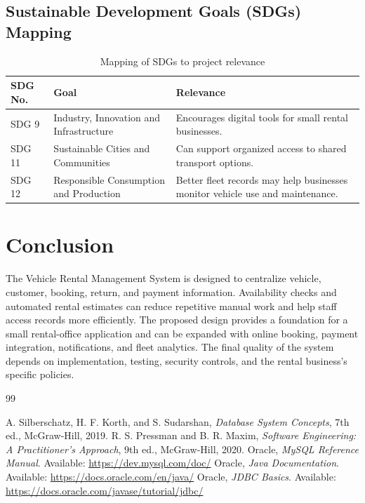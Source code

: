 \documentclass[11pt,a4paper]{report}
\begin{document}
\subsection{Sustainable Development Goals (SDGs) Mapping}
\begin{longtable}{|p{2cm}|p{5cm}|p{6cm}|}
\caption{Mapping of SDGs to project relevance}\\
\hline
\textbf{SDG No.} & \textbf{Goal} & \textbf{Relevance}\\ \hline
SDG 9 & Industry, Innovation and Infrastructure & Encourages digital tools for small rental businesses.\\ \hline
SDG 11 & Sustainable Cities and Communities & Can support organized access to shared transport options.\\ \hline
SDG 12 & Responsible Consumption and Production & Better fleet records may help businesses monitor vehicle use and maintenance.\\ \hline
\end{longtable}

\section{Conclusion}
The Vehicle Rental Management System is designed to centralize vehicle, customer, booking, return, and payment information. Availability checks and automated rental estimates can reduce repetitive manual work and help staff access records more efficiently. The proposed design provides a foundation for a small rental-office application and can be expanded with online booking, payment integration, notifications, and fleet analytics. The final quality of the system depends on implementation, testing, security controls, and the rental business's specific policies.

\begin{thebibliography}{99}
A. Silberschatz, H. F. Korth, and S. Sudarshan, \textit{Database System Concepts}, 7th ed., McGraw-Hill, 2019.
R. S. Pressman and B. R. Maxim, \textit{Software Engineering: A Practitioner's Approach}, 9th ed., McGraw-Hill, 2020.
Oracle, \textit{MySQL Reference Manual}. Available: \url{https://dev.mysql.com/doc/}
Oracle, \textit{Java Documentation}. Available: \url{https://docs.oracle.com/en/java/}
Oracle, \textit{JDBC Basics}. Available: \url{https://docs.oracle.com/javase/tutorial/jdbc/}
\end{thebibliography}
\end{document}
